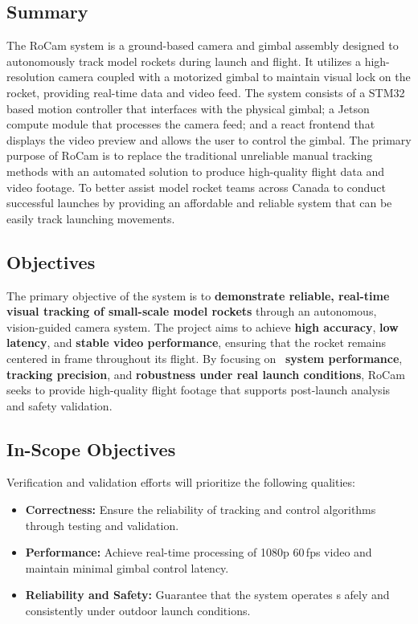 \documentclass[12pt, titlepage]{article}
\begin{document}
\subsection{Summary}

The RoCam system is a ground-based camera and gimbal assembly designed to
autonomously track model rockets during launch and flight. It utilizes a
high-resolution camera coupled with a motorized gimbal to maintain visual lock
on the rocket, providing real-time data and video feed. The system consists of
a STM32 based motion controller that interfaces with the physical gimbal; a
Jetson compute module that processes the camera feed; and a react frontend that
displays the video preview and allows the user to control the gimbal. The
primary purpose of RoCam is to replace the traditional unreliable manual
tracking methods with an automated solution to produce high-quality flight data
and video footage. To better assist model rocket teams across Canada to conduct
successful launches by providing an affordable and reliable system that can be
easily track launching movements.


\subsection{Objectives}
The primary objective of the system is to \textbf{demonstrate reliable,
  real-time visual tracking of small-scale model rockets} through an autonomous,
vision-guided camera system. The project aims to achieve \textbf{high
  accuracy}, \textbf{low latency}, and \textbf{stable video performance},
ensuring that the rocket remains centered in frame throughout its flight. By
focusing on \ \textbf{system performance}, \textbf{tracking precision}, and
\textbf{robustness under real launch conditions}, RoCam seeks to provide
high-quality flight footage that supports post-launch analysis and safety
validation.

\subsection{In-Scope Objectives}
Verification and validation efforts will prioritize the following qualities:
\begin{itemize}
  \item \textbf{Correctness:} Ensure the reliability of tracking and control
        algorithms through testing and validation.
  \item \textbf{Performance:} Achieve real-time processing of 1080p 60\,fps
        video and maintain minimal gimbal control latency.
  \item \textbf{Reliability and Safety:} Guarantee that the system operates s
        afely and consistently under outdoor launch conditions.
\end{itemize}
\end{document}
